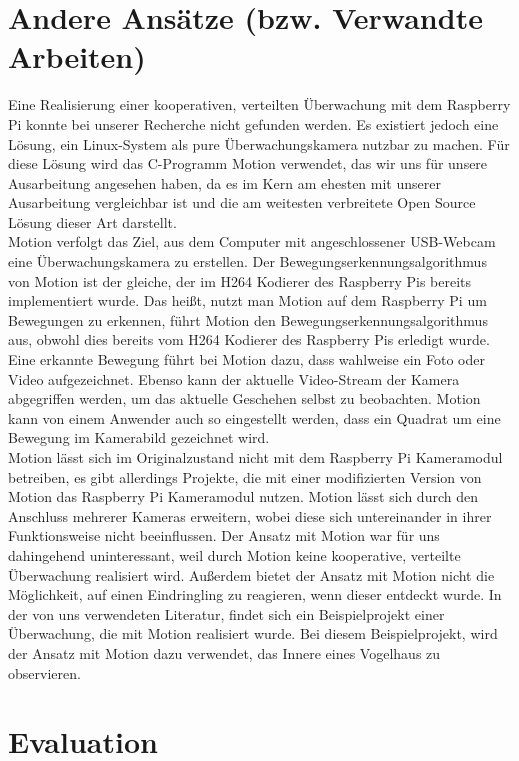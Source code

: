 \documentclass[journal]{IEEEtran}
\begin{document}
\section{Andere Ansätze (bzw. Verwandte Arbeiten)}
Eine Realisierung einer kooperativen, verteilten Überwachung mit dem Raspberry Pi konnte bei unserer Recherche nicht gefunden werden. Es existiert jedoch eine Lösung, ein Linux-System als pure Überwachungskamera nutzbar zu machen. Für diese Lösung wird das C-Programm Motion verwendet\cite{motion}, das wir uns für unsere Ausarbeitung angesehen haben, da es im Kern am ehesten mit unserer Ausarbeitung vergleichbar ist und die am weitesten verbreitete Open Source Lösung dieser Art darstellt. \\Motion verfolgt das Ziel, aus dem Computer mit angeschlossener USB-Webcam eine Überwachungskamera zu erstellen. Der Bewegungserkennungsalgorithmus von Motion ist der gleiche, der im H264 Kodierer des Raspberry Pis bereits implementiert wurde. Das heißt, nutzt man Motion auf dem Raspberry Pi um Bewegungen zu erkennen, führt Motion den Bewegungserkennungsalgorithmus aus, obwohl dies bereits vom H264 Kodierer des Raspberry Pis erledigt wurde. Eine erkannte Bewegung führt bei Motion dazu, dass wahlweise ein Foto oder Video aufgezeichnet. Ebenso kann der aktuelle Video-Stream der Kamera abgegriffen werden, um das aktuelle Geschehen selbst zu beobachten. Motion kann von einem Anwender auch so eingestellt werden, dass ein Quadrat um eine Bewegung im Kamerabild gezeichnet wird. \\Motion lässt sich im Originalzustand nicht mit dem Raspberry Pi Kameramodul betreiben, es gibt allerdings Projekte, die mit einer modifizierten Version von Motion das Raspberry Pi Kameramodul nutzen. Motion lässt sich durch den Anschluss mehrerer Kameras erweitern, wobei diese sich untereinander in ihrer Funktionsweise nicht beeinflussen. Der Ansatz mit Motion war für uns dahingehend uninteressant, weil durch Motion keine kooperative, verteilte Überwachung realisiert wird. Außerdem bietet der Ansatz mit Motion nicht die Möglichkeit, auf einen Eindringling zu reagieren, wenn dieser entdeckt wurde. In der von uns verwendeten Literatur, findet sich ein Beispielprojekt einer Überwachung, die mit Motion realisiert wurde. Bei diesem Beispielprojekt, wird der Ansatz mit Motion dazu verwendet, das Innere eines Vogelhaus zu observieren.\cite{raspi}


\section{Evaluation}
\end{document}

